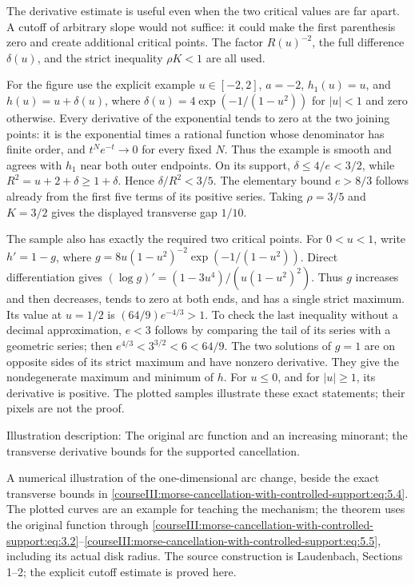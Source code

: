 The derivative estimate is useful even when the two critical values are far apart. A cutoff of arbitrary slope would not suffice: it could make the first parenthesis zero and create additional critical points. The factor \(R(u)^{-2}\), the full difference \(\delta(u)\), and the strict inequality \(\rho K<1\) are all used.

For the figure use the explicit example \(u\in[-2,2]\), \(a=-2\), \(h_1(u)=u\), and \(h(u)=u+\delta(u)\), where \(\delta(u)=4\exp(-1/(1-u^2))\) for \(|u|<1\) and zero otherwise. Every derivative of the exponential tends to zero at the two joining points: it is the exponential times a rational function whose denominator has finite order, and \(t^N e^{-t}\to0\) for every fixed \(N\). Thus the example is smooth and agrees with \(h_1\) near both outer endpoints. On its support, \(\delta\leq4/e<3/2\), while \(R^2=u+2+\delta\geq1+\delta\). Hence \(\delta/R^2<3/5\). The elementary bound \(e>8/3\) follows already from the first five terms of its positive series. Taking \(\rho=3/5\) and \(K=3/2\) gives the displayed transverse gap \(1/10\).

The sample also has exactly the required two critical points. For \(0<u<1\), write \(h'=1-g\), where \(g=8u(1-u^2)^{-2}\exp(-1/(1-u^2))\). Direct differentiation gives \((\log g)'=(1-3u^4)/(u(1-u^2)^2)\). Thus \(g\) increases and then decreases, tends to zero at both ends, and has a single strict maximum. Its value at \(u=1/2\) is \((64/9)e^{-4/3}>1\). To check the last inequality without a decimal approximation, \(e<3\) follows by comparing the tail of its series with a geometric series; then \(e^{4/3}<3^{3/2}<6<64/9\). The two solutions of \(g=1\) are on opposite sides of its strict maximum and have nonzero derivative. They give the nondegenerate maximum and minimum of \(h\). For \(u\leq0\), and for \(|u|\geq1\), its derivative is positive. The plotted samples illustrate these exact statements; their pixels are not the proof.

\label{courseIII:morse-cancellation-with-controlled-support:morse-cutoff-diagram}
Illustration description: The original arc function and an increasing minorant; the transverse derivative bounds for the supported cancellation.

A numerical illustration of the one-dimensional arc change, beside the exact transverse bounds in \eqref{courseIII:morse-cancellation-with-controlled-support:eq:5.4}. The plotted curves are an example for teaching the mechanism; the theorem uses the original function through \eqref{courseIII:morse-cancellation-with-controlled-support:eq:3.2}--\eqref{courseIII:morse-cancellation-with-controlled-support:eq:5.5}, including its actual disk radius. The source construction is Laudenbach, Sections 1--2; the explicit cutoff estimate is proved here.

